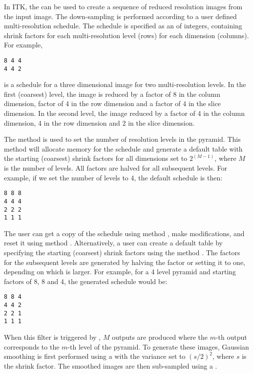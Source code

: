 

In ITK, the  can be used to create
a sequence of reduced resolution images from the input image.  The
down-sampling is performed according to a user defined multi-resolution
schedule. The schedule is specified as an  of integers,
containing shrink factors for each multi-resolution level (rows) for each
dimension (columns). For example,

\small
\begin{verbatim}
8 4 4
4 4 2
\end{verbatim}
\normalsize

is a schedule for a three dimensional image for two multi-resolution levels. 
In the first (coarsest) level, the image is reduced by a factor of 8 
in the column dimension, factor of 4 in the row dimension and a factor
of 4 in the slice dimension. In the second level, the image reduced
by a factor of 4 in the column dimension, 4 in the row dimension and
2 in the slice dimension.


The method  is used to set the number of
resolution levels in the pyramid. This method will allocate memory
for the schedule and generate a default table with the starting
(coarsest) shrink factors for all dimensions set to $2^(M-1)$, 
where $M$ is the number of levels. All factors are halved for
all subsequent levels. For example, if we set the number of levels
to 4, the default schedule is then:

\small
\begin{verbatim}
8 8 8
4 4 4
2 2 2
1 1 1
\end{verbatim}
\normalsize


The user can get a copy of the schedule using method ,
make modifications, and reset it using method .
Alternatively, a user can create a default table by specifying the
starting (coarsest) shrink factors using the method 
. The factors for the subsequent
levels are generated by halving the factor or setting it to one, 
depending on which is larger. For example, for a 4 level pyramid
and starting factors of 8, 8 and 4, the generated schedule would be:

\small
\begin{verbatim}
8 8 4
4 4 2
2 2 1
1 1 1
\end{verbatim}
\normalsize

When this filter is triggered by , $M$ outputs are produced
where the $m$-th output corresponds to the $m$-th level of the pyramid.
To generate these images, Gaussian smoothing is first performed using a
 with the variance set to $(s/2)^2$,
where $s$ is the shrink factor. The smoothed images are then sub-sampled using
a .
